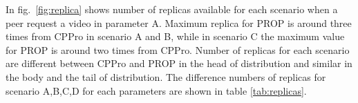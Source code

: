 \documentclass[10pt,final,journal,a4paper]{IEEEtran}
\begin{document}


In fig.~\ref{fig:replica} shows number of replicas available for each scenario when a peer request a video in parameter A.
Maximum replica for PROP is around three times from CPPro in scenario A and B, while in scenario C the maximum value for PROP is around two times from CPPro.
Number of replicas for each scenario are different between CPPro and PROP in the head of distribution and similar in the body and the tail of distribution. 
The difference numbers of replicas for scenario A,B,C,D for each parameters are shown in table \ref{tab:replicas}.






\end{document}
